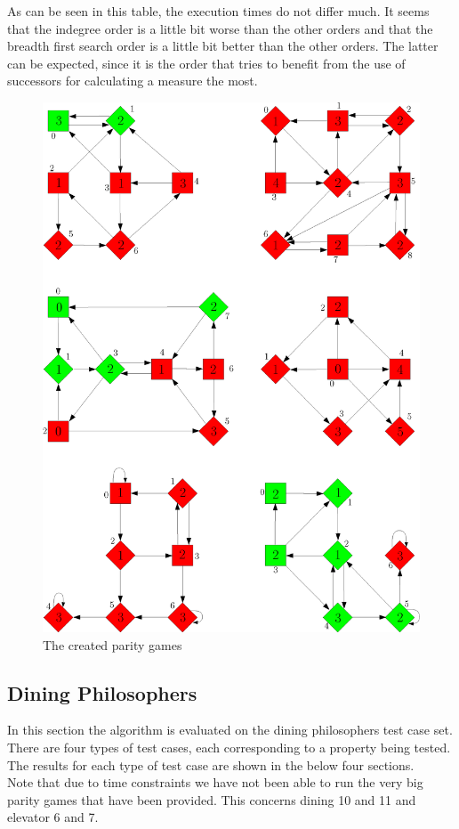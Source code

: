 \documentclass[10pt,a4paper]{article}
\begin{document}
As can be seen in this table, the execution times do not differ much. It seems that the indegree order is a little bit worse than the other orders and that the breadth first search order is a little bit better than the other orders. The latter can be expected, since it is the order that tries to benefit from the use of successors for calculating a measure the most.

\begin{figure}
\centering
\includegraphics[width=\textwidth]{paritygames.png}
\caption{The created parity games}
\label{paritygames}
\end{figure}


\subsection{Dining Philosophers}
In this section the algorithm is evaluated on the dining philosophers test case set. There are four types of test cases, each corresponding to a property being tested. The results for each type of test case are shown in the below four sections.\\
Note that due to time constraints we have not been able to run the very big parity games that have been provided. This concerns dining 10 and 11 and elevator 6 and 7.
\end{document}
